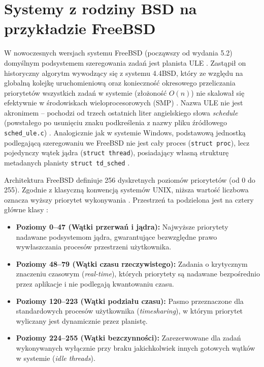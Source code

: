 \section{Systemy z rodziny BSD na przykładzie FreeBSD}
W nowoczesnych wersjach systemu FreeBSD (począwszy od wydania 5.2) domyślnym podsystemem szeregowania zadań jest planista ULE \cite{roberson2003ule}. Zastąpił on historyczny algorytm wywodzący się z systemu 4.4BSD, który ze względu na globalną kolejkę uruchomieniową oraz konieczność okresowego przeliczania priorytetów wszystkich zadań w systemie (złożoność $O(n)$) nie skalował się efektywnie w środowiskach wieloprocesorowych (SMP) \cite{roberson2003ule, mckusick2014freebsd}. Nazwa ULE nie jest akronimem -- pochodzi od trzech ostatnich liter angielskiego słowa \textit{schedule} (powstałego po usunięciu znaku podkreślenia z nazwy pliku źródłowego \texttt{sched\_ule.c}) \cite{roberson2003ule, freebsdSchedUleC}. Analogicznie jak w systemie Windows, podstawową jednostką podlegającą szeregowaniu we FreeBSD nie jest cały proces (\texttt{struct proc}), lecz pojedynczy wątek jądra (\texttt{struct thread}), posiadający własną strukturę metadanych planisty \texttt{struct td\_sched} \cite{freebsdSchedUleC}.

Architektura FreeBSD definiuje 256 dyskretnych poziomów priorytetów (od 0 do 255). Zgodnie z klasyczną konwencją systemów UNIX, niższa wartość liczbowa oznacza wyższy priorytet wykonywania \cite{mckusick2014freebsd}. Przestrzeń ta podzielona jest na cztery główne klasy \cite{mckusick2014freebsd}:
\begin{itemize}
	\item \textbf{Poziomy 0--47 (Wątki przerwań i jądra):} Najwyższe priorytety nadawane podsystemom jądra, gwarantujące bezwzględne prawo wywłaszczania procesów przestrzeni użytkownika.
	\item \textbf{Poziomy 48--79 (Wątki czasu rzeczywistego):} Zadania o krytycznym znaczeniu czasowym (\textit{real-time}), których priorytety są nadawane bezpośrednio przez aplikacje i nie podlegają kwantowaniu czasu.
	\item \textbf{Poziomy 120--223 (Wątki podziału czasu):} Pasmo przeznaczone dla standardowych procesów użytkownika (\textit{timesharing}), w którym priorytet wyliczany jest dynamicznie przez planistę.
	\item \textbf{Poziomy 224--255 (Wątki bezczynności):} Zarezerwowane dla zadań wykonywanych wyłącznie przy braku jakichkolwiek innych gotowych wątków w systemie (\textit{idle threads}).
\end{itemize}

